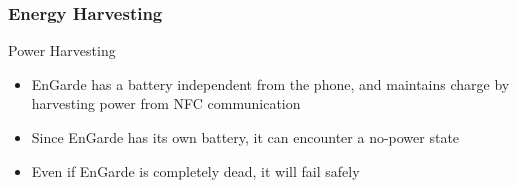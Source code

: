 \documentclass[unknownkeysallowed]{beamer}
\begin{document}
\begin{frame}
\frametitle{Energy Harvesting}
  \begin{center}
  \begin{minipage}{.9\textwidth}
  \begin{block}{Power Harvesting}
    \begin{itemize}
      \item{EnGarde has a battery independent from the phone, and maintains charge by harvesting power from NFC communication}
      \pause
      \vspace{1mm}
      \item{Since EnGarde has its own battery, it can encounter a no-power state}
      \pause
      \vspace{1mm}
      \item{Even if EnGarde is completely dead, it will fail safely}
    \end{itemize}
  \end{block}
  \end{minipage}
  \end{center}
\end{frame}






\end{document}

